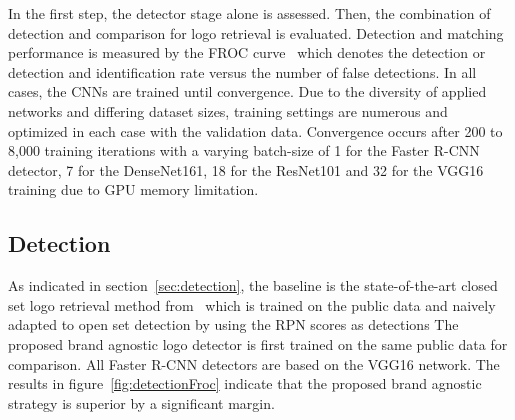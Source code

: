 \documentclass[a4paper,twoside]{article}
\begin{document}
In the first step, the detector stage alone is assessed. Then, the combination of detection and comparison for logo retrieval is evaluated. 
Detection and matching performance is measured by the \ac{FROC} curve~\cite{miller1969} which denotes the detection or detection and identification rate versus the number of false detections.
%
In all cases, the \acp{CNN} are trained until convergence. Due to the diversity of applied networks and differing dataset sizes, training settings are numerous and optimized in each case with the validation data. Convergence occurs after 200 to 8,000 training iterations with a varying batch-size of 1 for the Faster R-CNN detector, 7 for the DenseNet161, 18 for the ResNet101 and 32 for the VGG16 training due to GPU memory limitation.

\subsection{Detection}
As indicated in section~\ref{sec:detection}, the baseline is the state-of-the-art closed set logo retrieval method from~\cite{su2016} which is trained on the public data and naively adapted to open set detection by using the \ac{RPN} scores as detections
The proposed brand agnostic logo detector is first trained on the same public data for comparison. All Faster R-CNN detectors are based on the VGG16 network.
The results in figure~\ref{fig:detectionFroc} indicate that the proposed brand agnostic strategy is superior by a significant margin. 
%
\end{document}
